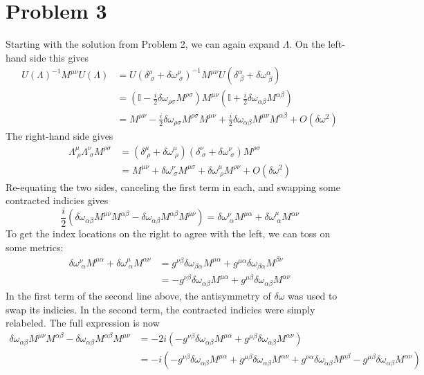 \documentclass[12pt]{article}
\begin{document}
\section*{Problem 3}
Starting with the solution from Problem 2, we can again expand $\Lambda$. On the left-hand side this gives
\begin{align*}
    U(\Lambda)^{-1}M^{\mu\nu}U(\Lambda) &= U(\delta_{\;\sigma}^\rho + \delta\omega_{\;\sigma}^\rho)^{-1}M^{\mu\nu}U(\delta_{\;\beta}^\alpha + \delta\omega_{\;\beta}^\alpha) \\
    &= \left(\mathbb{I} - \frac{i}{2}\delta\omega_{\rho\sigma}M^{\rho\sigma}\right)M^{\mu\nu}\left(\mathbb{I} + \frac{i}{2}\delta\omega_{\alpha\beta}M^{\alpha\beta}\right) \\
    &= M^{\mu\nu} - \frac{i}{2}\delta\omega_{\rho\sigma}M^{\rho\sigma}M^{\mu\nu} + \frac{i}{2}\delta\omega_{\alpha\beta}M^{\mu\nu}M^{\alpha\beta} + O(\delta\omega^2)
\end{align*}
The right-hand side gives
\begin{align*}
    \Lambda_{\;\rho}^\mu\Lambda_{\;\sigma}^\nu M^{\rho\sigma} &= (\delta_{\;\rho}^\mu + \delta\omega_{\;\rho}^\mu)(\delta_{\;\sigma}^\nu + \delta\omega_{\;\sigma}^\nu)M^{\rho\sigma} \\
    &= M^{\mu\nu} + \delta\omega_{\;\sigma}^\nu M^{\mu\sigma} + \delta\omega_{\;\rho}^\mu M^{\rho\nu} + O(\delta\omega^2)
\end{align*}
Re-equating the two sides, canceling the first term in each, and swapping some contracted indicies gives
\[ \frac{i}{2}\left(\delta\omega_{\alpha\beta}M^{\mu\nu}M^{\alpha\beta} - \delta\omega_{\alpha\beta}M^{\alpha\beta}M^{\mu\nu}\right) = \delta\omega_{\;\alpha}^\nu M^{\mu\alpha} + \delta\omega_{\;\alpha}^\mu M^{\alpha\nu} \]
To get the index locations on the right to agree with the left, we can toss on some metrics:
\begin{align*}
    \delta\omega_{\;\alpha}^\nu M^{\mu\alpha} + \delta\omega_{\;\alpha}^\mu M^{\alpha\nu} &= g^{\nu\beta}\delta\omega_{\beta\alpha}M^{\mu\alpha} + g^{\mu\alpha}\delta\omega_{\beta\alpha}M^{\beta\nu} \\
    &= -g^{\nu\beta}\delta\omega_{\alpha\beta}M^{\mu\alpha} + g^{\mu\beta}\delta\omega_{\alpha\beta}M^{\alpha\nu}
\end{align*}
In the first term of the second line above, the antisymmetry of $\delta\omega$ was used to swap its indicies. In the second term, the contracted indicies were simply relabeled. The full expression is now
\begin{align*}
    \delta\omega_{\alpha\beta}M^{\mu\nu}M^{\alpha\beta} - \delta\omega_{\alpha\beta}M^{\alpha\beta}M^{\mu\nu} &= -2i\left(-g^{\nu\beta}\delta\omega_{\alpha\beta}M^{\mu\alpha} + g^{\mu\beta}\delta\omega_{\alpha\beta}M^{\alpha\nu} \right) \\
    &= -i\left(-g^{\nu\beta}\delta\omega_{\alpha\beta}M^{\mu\alpha} + g^{\mu\beta}\delta\omega_{\alpha\beta}M^{\alpha\nu} + g^{\nu\alpha}\delta\omega_{\alpha\beta}M^{\mu\beta} - g^{\mu\beta}\delta\omega_{\alpha\beta}M^{\alpha\nu} \right)
\end{align*}
\end{document}
